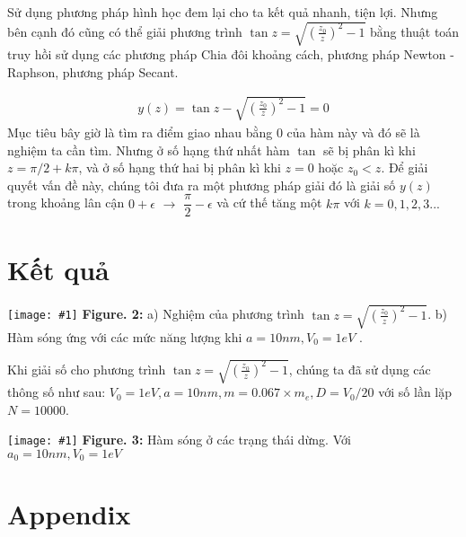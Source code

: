 \documentclass{article}
\newcommand{\image}[3]{
	\begin{center}
		\texttt{[image: \#1]}
		\textbf{Figure. #2:} #3
		\label{fig:#1}
	\end{center}
}
\begin{document}
	Sử dụng phương pháp hình học đem lại cho ta kết quả nhanh, tiện lợi. Nhưng bên cạnh đó cũng có thể giải phương trình $\tan z = \sqrt{\left( \frac{z_0}{z} \right)^2 - 1}$ bằng thuật toán truy hồi sử dụng các phương pháp Chia đôi khoảng cách, phương pháp Newton - Raphson, phương pháp Secant.
	
	\begin{align}
		y(z) = \tan z - \sqrt{\left( \frac{z_0}{z} \right)^2 - 1} = 0
	\end{align}
	Mục tiêu bây giờ là tìm ra điểm giao nhau bằng 0 của hàm này và đó sẽ là nghiệm ta cần tìm. Nhưng ở số hạng thứ nhất hàm $\tan$ sẽ bị phân kì khi $z = \pi/2 + k \pi$, và ở số hạng thứ hai bị phân kì khi $z = 0$ hoặc $z_0 < z$. Để giải quyết vấn đề này, chúng tôi đưa ra một phương pháp giải đó là giải số $y(z)$ trong khoảng lân cận $0+ \epsilon$ $\rightarrow $ $\dfrac{\pi}{2} - \epsilon$ và cứ thế tăng một $k\pi$ với $k = 0,1,2,3...$
	
	\newpage
	
	\section{Kết quả}
	\image{Final.pdf}{2}{a) Nghiệm của phương trình $\tan z = \sqrt{\left( \frac{z_0}{z} \right)^2 - 1}$. b) Hàm sóng ứng với các mức năng lượng khi $a = 10nm, V_0 = 1eV$ .}
	
	Khi giải số cho phương trình $\tan z = \sqrt{\left( \frac{z_0}{z} \right)^2 - 1}$, chúng ta đã sử dụng các thông số như sau: $V_0 = 1eV, a = 10 nm,m = 0.067 \times m_e,D = V_0/20$ với số lần lặp $N= 10000$. 

	\image{wavefunctions.pdf}{3}{Hàm sóng ở các trạng thái dừng. Với $a_0 = 10nm, V_0 = 1eV $}

	\clearpage
	\section{Appendix}
\end{document}
